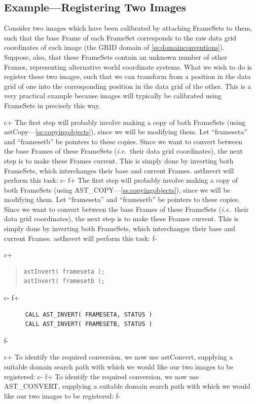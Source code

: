 \documentclass[twoside,11pt]{article}
\newcommand{\secref}[1]{\S\ref{#1}}
\renewcommand{\secref}[1]{\ref{#1}}
\begin{document}
\subsection{\label{ss:registeringimages}Example---Registering Two Images}

Consider two images which have been calibrated by attaching FrameSets
to them, such that the base Frame of each FrameSet corresponds to the
raw data grid coordinates of each image (the GRID domain of
\secref{ss:domainconventions}). Suppose, also, that these FrameSets
contain an unknown number of other Frames, representing alternative
world coordinate systems.  What we wish to do is register these two
images, such that we can transform from a position in the data grid of
one into the corresponding position in the data grid of the other.
This is a very practical example because images will typically be
calibrated using FrameSets in precisely this way.

c+
The first step will probably involve making a copy of both FrameSets
(using astCopy---\secref{ss:copyingobjects}), since we will be
modifying them. Let ``frameseta'' and ``framesetb'' be pointers to
these copies. Since we want to convert between the base Frames of
these FrameSets ({\em{i.e.}}\ their data grid coordinates), the next
step is to make these Frames current. This is simply done by inverting
both FrameSets, which interchanges their base and current
Frames. astInvert will perform this task:
c-
f+
The first step will probably involve making a copy of both FrameSets
(using AST\_COPY---\secref{ss:copyingobjects}), since we will be
modifying them. Let ``frameseta'' and ``framesetb'' be pointers to
these copies. Since we want to convert between the base Frames of
these FrameSets ({\em{i.e.}}\ their data grid coordinates), the next
step is to make these Frames current. This is simply done by inverting
both FrameSets, which interchanges their base and current
Frames. astInvert will perform this task:
f-

c+
\begin{quote}
\small
\begin{verbatim}
astInvert( frameseta );
astInvert( framesetb );
\end{verbatim}
\normalsize
\end{quote}
c-
f+
\small
\begin{verbatim}
      CALL AST_INVERT( FRAMESETA, STATUS )
      CALL AST_INVERT( FRAMESETB, STATUS )
\end{verbatim}
\normalsize
f-

c+
To identify the required conversion, we now use astConvert, supplying
a suitable domain search path with which we would like our two images
to be registered:
c-
f+
To identify the required conversion, we now use AST\_CONVERT,
supplying a suitable domain search path with which we would like our
two images to be registered:
f-
\end{document}
